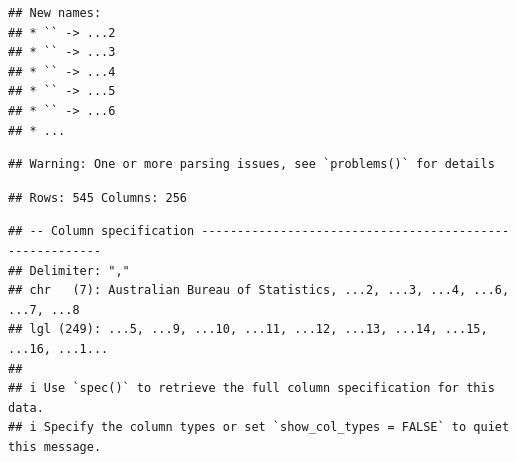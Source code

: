 \documentclass[
]{article}
\begin{document}
\begin{verbatim}
## New names:
## * `` -> ...2
## * `` -> ...3
## * `` -> ...4
## * `` -> ...5
## * `` -> ...6
## * ...
\end{verbatim}

\begin{verbatim}
## Warning: One or more parsing issues, see `problems()` for details
\end{verbatim}

\begin{verbatim}
## Rows: 545 Columns: 256
\end{verbatim}

\begin{verbatim}
## -- Column specification --------------------------------------------------------
## Delimiter: ","
## chr   (7): Australian Bureau of Statistics, ...2, ...3, ...4, ...6, ...7, ...8
## lgl (249): ...5, ...9, ...10, ...11, ...12, ...13, ...14, ...15, ...16, ...1...
## 
## i Use `spec()` to retrieve the full column specification for this data.
## i Specify the column types or set `show_col_types = FALSE` to quiet this message.
\end{verbatim}
\end{document}
